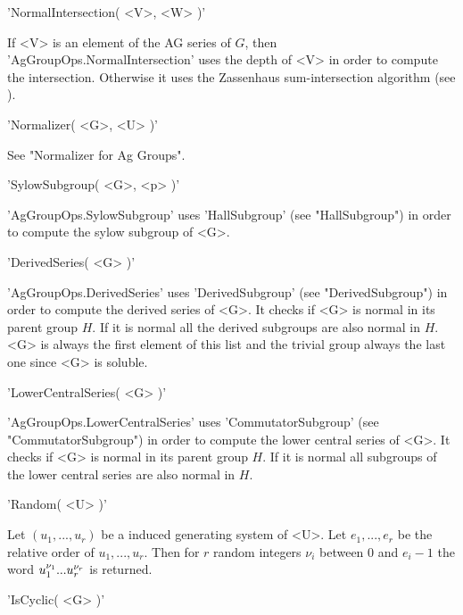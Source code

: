 \vspace{5mm}
'NormalIntersection( <V>, <W> )'%

If   <V>    is  an   element of     the     AG series     of  $G$,   then
'AgGroupOps.NormalIntersection' uses the depth of <V> in order to compute
the intersection. Otherwise   it uses   the   Zassenhaus sum-intersection
algorithm (see \cite{GS90}).

\vspace{5mm}
'Normalizer( <G>, <U> )'%

See "Normalizer for Ag Groups".

\vspace{5mm}
'SylowSubgroup( <G>, <p> )'%

'AgGroupOps.SylowSubgroup'  uses 'HallSubgroup' (see   "HallSubgroup") in
order to compute the sylow subgroup of <G>.

\vspace{5mm}
'DerivedSeries( <G> )'%

'AgGroupOps.DerivedSeries' uses 'DerivedSubgroup' (see "DerivedSubgroup")
in order to compute the derived series of <G>. It checks if <G> is normal
in its parent group $H$.  If it  is normal all  the derived subgroups are
also normal in $H$. <G> is always the first element  of this list and the
trivial group always the last one since <G> is soluble.

\vspace{5mm}
'LowerCentralSeries( <G> )'%

'AgGroupOps.LowerCentralSeries'    uses     'CommutatorSubgroup'     (see
"CommutatorSubgroup") in  order to  compute the  lower  central series of
<G>.  It checks if <G>  is  normal in its parent  group   $H$.  If it  is
normal all subgroups of the lower central series are also normal in $H$.

\vspace{5mm}
'Random( <U> )'%

Let $(u_1, ..., u_r)$ be  a induced  generating system of <U>.  Let $e_1,
..., e_r$ be the relative order of $u_1, ..., u_r$.  Then for  $r$ random
integers $\nu_i$ between $0$ and $e_i - 1$  the word $u_1^{\nu_1}\* ...\*
u_r^{\nu_r}$ is returned.

\vspace{5mm}
'IsCyclic( <G> )'%

